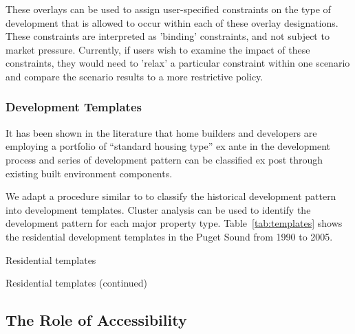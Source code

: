 These overlays can be used to assign user-specified constraints on
the type of development that is allowed to occur within each of
these overlay designations.  These constraints are interpreted as
'binding' constraints, and not subject to
market pressure.  Currently, if users wish to examine the impact of
these constraints, they would need to 'relax' a particular
constraint within one scenario and compare the scenario results to
a more restrictive policy.

\subsubsection{Development Templates}
It has been shown in the literature that home builders and
developers are employing a portfolio of ``standard housing
type'' ex ante in the development process and series of
development pattern can be classified ex post through
existing built environment components\cite{Song2007}. 

We adapt a procedure similar to \cite{Song2007} to classify
the historical development pattern into development
templates.  Cluster analysis can be used to identify the
development pattern for each major property type.
Table~\ref{tab:templates} shows the residential development
templates in the Puget Sound from 1990 to 2005.

\begin{landscape}
\begin{table}[ht]
\label{tab:templates}
\begin{center}
  \caption{Residential templates}

\end{center}
\end{table}
\end{landscape}

\begin{landscape}
\begin{table}[ht]
\begin{center}
  \caption{Residential templates (continued)}

\end{center}
\end{table}
\end{landscape}


\subsection{The Role of Accessibility}


